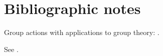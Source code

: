 \documentclass[11pt,oneside]{article}
\newcommand{\thinplus}{\!+\!}
\begin{document}




\section{Bibliographic notes}

Group actions with applications to group theory: \cite{ConradGroup,ConradTransitive}.

See \cite{Dress1971}.


{}

\end{document}
